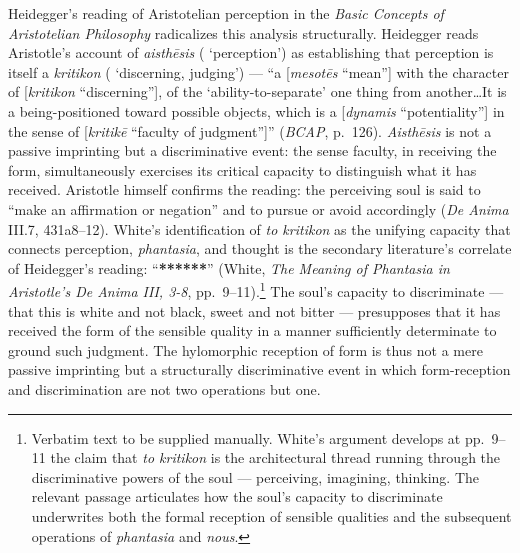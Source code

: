 Heidegger's reading of Aristotelian perception in the \textit{Basic Concepts of Aristotelian Philosophy} radicalizes this analysis structurally. Heidegger reads Aristotle's account of \textit{aisthēsis} ( `perception') as establishing that perception is itself a \textit{kritikon} ( `discerning, judging') --- ``a  [\textit{mesotēs} ``mean''] with the character of  [\textit{kritikon} ``discerning''], of the `ability-to-separate' one thing from another\dots It is a being-positioned toward possible objects, which is a  [\textit{dynamis} ``potentiality''] in the sense of  [\textit{kritikē} ``faculty of judgment'']'' (\textit{BCAP}, p.~126). \textit{Aisthēsis} is not a passive imprinting but a discriminative event: the sense faculty, in receiving the form, simultaneously exercises its critical capacity to distinguish what it has received. Aristotle himself confirms the reading: the perceiving soul is said to ``make an affirmation or negation'' and to pursue or avoid accordingly (\textit{De Anima} III.7, 431a8--12). White's identification of \textit{to kritikon} as the unifying capacity that connects perception, \textit{phantasia}, and thought is the secondary literature's correlate of Heidegger's reading: ``\textbf{******}'' (White, \textit{The Meaning of Phantasia in Aristotle's De Anima III, 3-8}, pp.~9--11).\footnote{Verbatim text to be supplied manually. White's argument develops at pp.~9--11 the claim that \textit{to kritikon} is the architectural thread running through the discriminative powers of the soul --- perceiving, imagining, thinking. The relevant passage articulates how the soul's capacity to discriminate underwrites both the formal reception of sensible qualities and the subsequent operations of \textit{phantasia} and \textit{nous}.} The soul's capacity to discriminate --- that this is white and not black, sweet and not bitter --- presupposes that it has received the form of the sensible quality in a manner sufficiently determinate to ground such judgment. The hylomorphic reception of form is thus not a mere passive imprinting but a structurally discriminative event in which form-reception and discrimination are not two operations but one.

